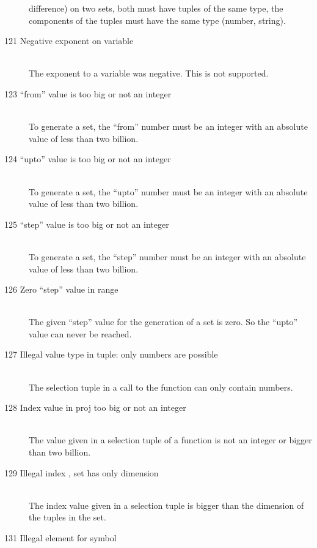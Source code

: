 \begin{description}
   difference) on two sets, 
   both must have tuples of the same type,\ie
   the components of the tuples must have the same type (number,
   string).
\item[121 Negative exponent on variable]\ \\
   The exponent to a variable was negative. This is not supported.
\item[123 ``from'' value \code{xxx} is too big or not an
   integer]\ \\
   To generate a set, the ``from'' number must be an integer with an
   absolute value of less than two billion.
\item[124 ``upto'' value \code{xxx} is too big or not an
   integer]\ \\
   To generate a set, the ``upto'' number must be an integer with an
   absolute value of less than two billion.
\item[125 ``step'' value \code{xxx} is too big or not an
   integer]\ \\
   To generate a set, the ``step'' number must be an integer with an
   absolute value of less than two billion.
\item[126 Zero ``step'' value in range]\ \\
   The given ``step'' value for the generation of a set is
   zero. So the ``upto'' value can never be reached. 
\item[127 Illegal value type in tuple: \code{xxx} only numbers are
   possible]\ \\
   The selection tuple in a call to the  function can
   only contain numbers.
\item[128 Index value \code{xxx} in proj too big or not an integer]\ \\
   The value given in a selection tuple of a  function is
   not an integer or bigger than two billion.
\item[129 Illegal index \code{xxx}, set has only dimension
   \code{yyy}]\ \\
   The index value given in a selection tuple is bigger than the
   dimension of the tuples in the set.
\item[131 Illegal element \code{xxx} for symbol]\ \\

\end{description}

